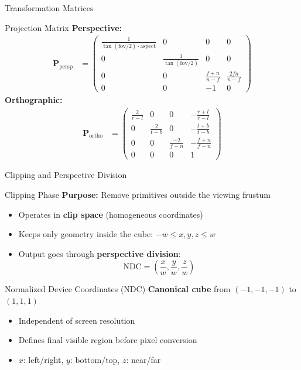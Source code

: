 \begin{frame}{Transformation Matrices}
{\begin{mathbox}{Projection Matrix}
      \textbf{Perspective:}
      \begin{align*}
        \mathbf{P}_{\text{persp}} &=
        \begin{pmatrix}
          \frac{1}{\tan(\text{fov}/2) \cdot \text{aspect}} & 0 & 0 & 0 \\
          0 & \frac{1}{\tan(\text{fov}/2)} & 0 & 0 \\
          0 & 0 & \frac{f+n}{n-f} & \frac{2fn}{n-f} \\
          0 & 0 & -1 & 0
        \end{pmatrix}
      \end{align*}
      \textbf{Orthographic:}
      \begin{align*}
        \mathbf{P}_{\text{ortho}} &=
        \begin{pmatrix}
          \frac{2}{r-l} & 0 & 0 & -\frac{r+l}{r-l} \\
          0 & \frac{2}{t-b} & 0 & -\frac{t+b}{t-b} \\
          0 & 0 & \frac{-2}{f-n} & -\frac{f+n}{f-n} \\
          0 & 0 & 0 & 1
        \end{pmatrix}
      \end{align*}
    \end{mathbox}
  }
\end{frame}
\begin{frame}{Clipping and Perspective Division}
  \small
  \begin{raybox}{Clipping Phase}
    \textbf{Purpose:} Remove primitives outside the viewing frustum

    \begin{itemize}
      \item Operates in \textbf{clip space} (homogeneous coordinates)
      \item Keeps only geometry inside the cube: $-w \leq x, y, z \leq w$
      \item Output goes through \textbf{perspective division}:
        \[
          \text{NDC} = \left( \frac{x}{w}, \frac{y}{w}, \frac{z}{w} \right)
        \]
    \end{itemize}
  \end{raybox}

  \begin{conceptbox}{Normalized Device Coordinates (NDC)}
    \textbf{Canonical cube} from $(-1, -1, -1)$ to $(1, 1, 1)$
    \begin{itemize}
      \item Independent of screen resolution
      \item Defines final visible region before pixel conversion
      \item $x$: left/right, $y$: bottom/top, $z$: near/far
    \end{itemize}
  \end{conceptbox}
\end{frame}

